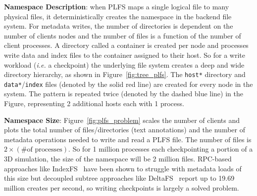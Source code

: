 

\textbf{Namespace Description}: when PLFS maps a single logical file to many
physical files, it deterministically creates the namespace in the backend file
system.  For metadata writes, the number of directories is dependent on the
number of clients nodes and the number of files is a function of the number of
client processes.  A directory called a container is created per node and
processes write data and index files to the container assigned to their host.
So for a write workload ({\it i.e.} a checkpoint) the underlying file system
creates a deep and wide directory hierarchy, as shown in
Figure~\ref{fig:tree_plfs}.  The \texttt{host*} directory and
\texttt{data*}/\texttt{index} files (denoted by the solid red line) are created
for every node in the system. The pattern is repeated twice (denoted by the
dashed blue line) in the Figure, representing 2 additional hosts each with 1
process.

\textbf{Namespace Size}: Figure~\ref{fig:plfs_problem} scales the number of
clients and plots the total number of files/directories (text annotations) and
the number of metadata operations needed to write and read a PLFS file.  The
number of files is \(2\times(\text{\# of processes})\).  So for 1 million
processes each checkpointing a portion of a 3D simulation, the size of the
namespace will be 2 million files.  RPC-based approaches like
IndexFS~\cite{ren:sc2014-indexfs} have been shown to struggle with metadata
loads of this size but decoupled subtree approaches like
DeltaFS~\cite{zheng:pdsw2015-deltafs} report up to 19.69 million creates per
second, so writing checkpoints is largely a solved problem.

